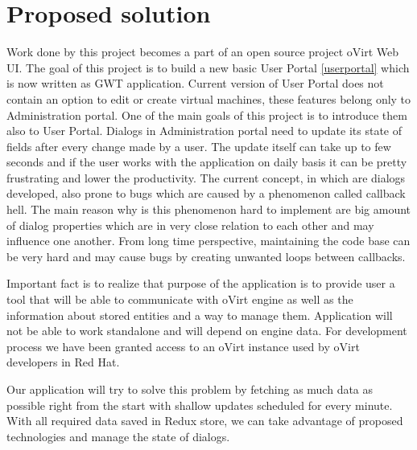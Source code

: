 \chapter{Proposed solution}
Work done by this project becomes a part of an open source project oVirt Web UI. The goal of this project is to build a new basic User Portal \ref{userportal} which is now written as GWT\cite{gwt} application.
Current version of User Portal does not contain an option to edit or create virtual machines, these features belong only to Administration portal. One of the main goals of this project is to introduce them also to User Portal.
Dialogs in Administration portal need to update its state of fields after every change made by a user. The update itself can take up to few seconds and if the user works with the application on daily basis it can be pretty frustrating and lower the productivity. 
The current concept, in which are dialogs developed, also prone to bugs which are caused by a phenomenon called callback hell. The main reason why is this phenomenon hard to implement are big amount of dialog properties which are in very close relation to each other and may influence one another. From long time perspective, maintaining the code base can be very hard and may cause bugs by creating unwanted loops between callbacks. 

Important fact is to realize that purpose of the application is to provide user a tool that will be able to communicate with oVirt engine as well as the information about stored entities and a way to manage them. Application will not be able to work standalone and will depend on engine data. For development process we have been granted access to an oVirt instance used by oVirt developers in Red Hat.  

Our application will try to solve this problem by fetching as much data as possible right from the start with shallow updates scheduled for every minute. With all required data saved in Redux store, we can take advantage of proposed technologies and manage the state of dialogs.


